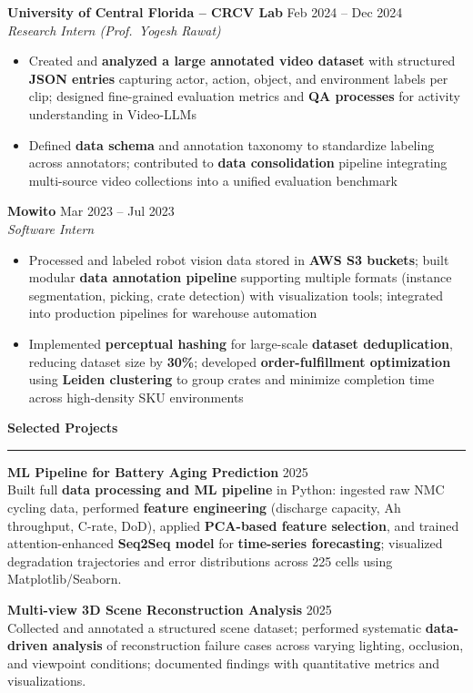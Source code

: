 \documentclass[8.2pt]{article}
\newcommand{\sect}[1]{\vspace{1pt}\noindent\textbf{\large #1}\vspace{1pt}\hrule\vspace{3pt}}
\begin{document}
\vspace{-2mm}
\textbf{University of Central Florida -- CRCV Lab} \hfill Feb 2024 -- Dec 2024\\
\emph{Research Intern (Prof.\ Yogesh Rawat)}\\
\vspace{-6mm}
\begin{itemize}[leftmargin=*,noitemsep,topsep=1pt]
  \item Created and \textbf{analyzed a large annotated video dataset} with structured \textbf{JSON entries} capturing actor, action, object, and environment labels per clip; designed fine-grained evaluation metrics and \textbf{QA processes} for activity understanding in Video-LLMs
  \item Defined \textbf{data schema} and annotation taxonomy to standardize labeling across annotators; contributed to \textbf{data consolidation} pipeline integrating multi-source video collections into a unified evaluation benchmark
\end{itemize}

\vspace{-2mm}
\textbf{Mowito} \hfill Mar 2023 -- Jul 2023\\
\emph{Software Intern}\\
\vspace{-6mm}
\begin{itemize}[leftmargin=*,noitemsep,topsep=1pt]
  \item Processed and labeled robot vision data stored in \textbf{AWS S3 buckets}; built modular \textbf{data annotation pipeline} supporting multiple formats (instance segmentation, picking, crate detection) with visualization tools; integrated into production pipelines for warehouse automation
  \item Implemented \textbf{perceptual hashing} for large-scale \textbf{dataset deduplication}, reducing dataset size by \textbf{30\%}; developed \textbf{order-fulfillment optimization} using \textbf{Leiden clustering} to group crates and minimize completion time across high-density SKU environments
\end{itemize}

\sect{Selected Projects}
\vspace{-2mm}

\textbf{ML Pipeline for Battery Aging Prediction} \hfill 2025\\
Built full \textbf{data processing and ML pipeline} in Python: ingested raw NMC cycling data, performed \textbf{feature engineering} (discharge capacity, Ah throughput, C-rate, DoD), applied \textbf{PCA-based feature selection}, and trained attention-enhanced \textbf{Seq2Seq model} for \textbf{time-series forecasting}; visualized degradation trajectories and error distributions across 225 cells using Matplotlib/Seaborn.

\textbf{Multi-view 3D Scene Reconstruction Analysis} \hfill 2025\\
Collected and annotated a structured scene dataset; performed systematic \textbf{data-driven analysis} of reconstruction failure cases across varying lighting, occlusion, and viewpoint conditions; documented findings with quantitative metrics and visualizations.
\end{document}
